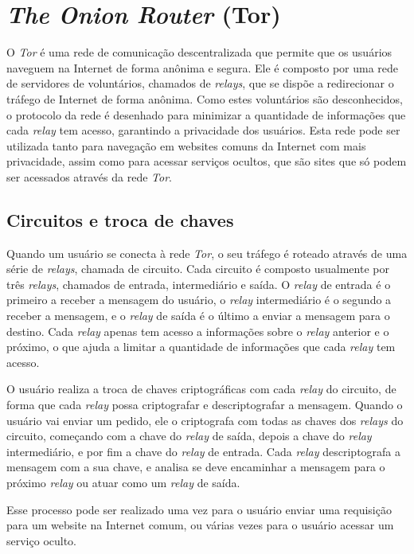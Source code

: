 \section{\textit{The Onion Router} (Tor)}

O \textit{Tor} é uma rede de comunicação descentralizada que permite que os usuários naveguem na Internet de forma anônima e segura. Ele é composto por uma rede de servidores de voluntários, chamados de \textit{relays}, que se dispõe a redirecionar o tráfego de Internet de forma anônima. Como estes voluntários são desconhecidos, o protocolo da rede é desenhado para minimizar a quantidade de informações que cada \textit{relay} tem acesso, garantindo a privacidade dos usuários. Esta rede pode ser utilizada tanto para navegação em websites comuns da Internet com mais privacidade, assim como para acessar serviços ocultos, que são sites que só podem ser acessados através da rede \textit{Tor}.

\subsection{Circuitos e troca de chaves}

Quando um usuário se conecta à rede \textit{Tor}, o seu tráfego é roteado através de uma série de \textit{relays}, chamada de circuito. Cada circuito é composto usualmente por três \textit{relays}, chamados de entrada, intermediário e saída. O \textit{relay} de entrada é o primeiro a receber a mensagem do usuário, o \textit{relay} intermediário é o segundo a receber a mensagem, e o \textit{relay} de saída é o último a enviar a mensagem para o destino. Cada \textit{relay} apenas tem acesso a informações sobre o \textit{relay} anterior e o próximo, o que ajuda a limitar a quantidade de informações que cada \textit{relay} tem acesso.

O usuário realiza a troca de chaves criptográficas com cada \textit{relay} do circuito, de forma que cada \textit{relay} possa criptografar e descriptografar a mensagem. Quando o usuário vai enviar um pedido, ele o criptografa com todas as chaves dos \textit{relays} do circuito, começando com a chave do \textit{relay} de saída, depois a chave do \textit{relay} intermediário, e por fim a chave do \textit{relay} de entrada. Cada \textit{relay} descriptografa a mensagem com a sua chave, e analisa se deve encaminhar a mensagem para o próximo \textit{relay} ou atuar como um \textit{relay} de saída.

Esse processo pode ser realizado uma vez para o usuário enviar uma requisição para um website na Internet comum, ou várias vezes para o usuário acessar um serviço oculto.

